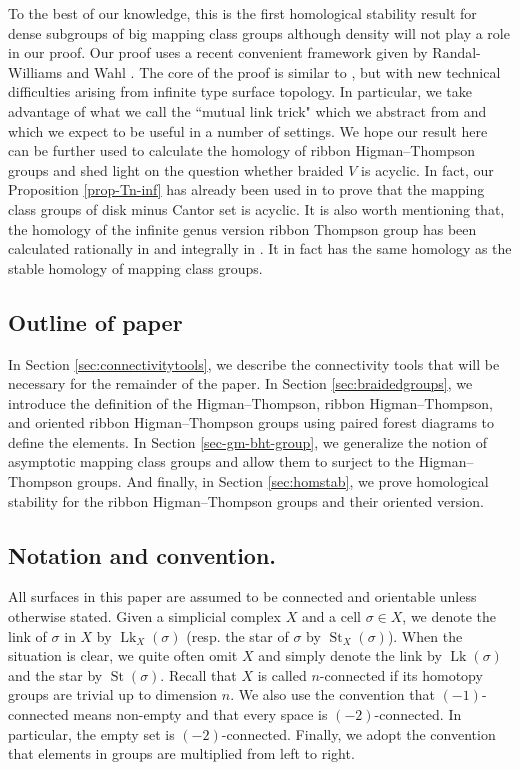 \documentclass[11pt, a4paper]{amsart}
\theoremstyle{definition}
\DeclareMathOperator{\Lk}{Lk}
\DeclareMathOperator{\St}{St}
\begin{document}
To the best of our knowledge, this is the first homological stability result for dense subgroups of big mapping class groups although density will not play a role in our proof. Our proof uses a recent convenient framework given by Randal-Williams and Wahl \cite{RWW17}. The core of the proof is similar to \cite{SW19}, but with new technical difficulties arising from infinite type surface topology. In particular, we take advantage of what we call the ``mutual link trick" which we abstract from \cite{BFM+16} and which we expect to be useful in a number of settings.
We hope our result here can be  further used to calculate the homology of ribbon Higman--Thompson groups and shed light on the question whether braided $V$ is acyclic. In fact, our Proposition \ref{prop-Tn-inf} has already been used in \cite{PalmerWu22} to prove that the mapping class groups of disk minus Cantor set is acyclic. It is also worth mentioning that, the homology of the infinite genus version ribbon Thompson group  has been calculated rationally in \cite[Theorem 1.2]{FK09} and integrally in \cite[Theorem 1.16]{ABF+21}. It in fact has the same homology as the stable homology of mapping class groups.



\subsection*{Outline of paper}
In Section \ref{sec:connectivitytools}, we describe the connectivity tools that will be necessary for the remainder of the paper. In Section \ref{sec:braidedgroups}, we introduce the definition of the Higman--Thompson, ribbon Higman--Thompson, and oriented ribbon Higman--Thompson groups using paired forest diagrams to define the elements. In Section \ref{sec-gm-bht-group}, we generalize the notion of asymptotic mapping class groups and allow them to surject to the Higman--Thompson groups. And finally, in Section \ref{sec:homstab}, we prove homological stability for the ribbon Higman--Thompson groups and their oriented version.


\subsection*{Notation and convention.} All surfaces in this paper are assumed to be connected and orientable unless otherwise stated. Given a simplicial complex $X$ and a cell $\sigma \in X$, we denote the link of $\sigma$ in $X$ by $\Lk_X(\sigma)$ (resp. the star of $\sigma$ by $\St_X (\sigma)$). When the situation is clear, we quite often omit $X$ and simply denote the link by $\Lk (\sigma)$ and the star by $\St (\sigma)$. Recall that $X$ is called $n$-connected if its homotopy groups are trivial up to dimension $n$.   We also use the convention that  $(-1)$-connected means non-empty and that every space is $(-2)$-connected. In particular, the empty set is $(-2)$-connected. Finally, we adopt the convention that elements in groups are multiplied from left to right.
\end{document}
